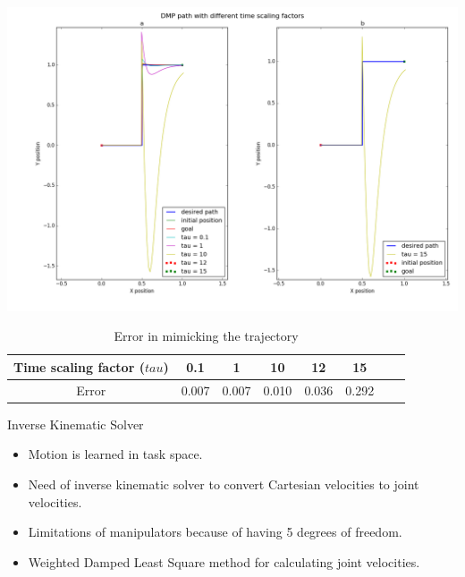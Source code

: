 \documentclass{beamer}
\begin{document}
	
	\begin{frame}
		\includegraphics[width=\textwidth]{images/tau_}
	\end{frame}
	
	\begin{frame}
		\begin{center}
			\begin{table}[H]
				\centering
				\begin{tabular}{| c | c | c | c | c | c | c | c |}	
					\hline
					Time scaling factor ($tau$) & 0.1 & 1 & 10 & 12 & 15 \\       
					\hline
					Error & 0.007 & 0.007 & 0.010 & 0.036 & 0.292   \\
					\hline
				\end{tabular}
				\caption{Error in mimicking the trajectory}
			\end{table}\label{_tau_e}
		\end{center}
	\end{frame}
	
	\begin{frame}{Inverse Kinematic Solver}
		\begin{itemize}
			\item Motion is learned in task space. 
			\item Need of inverse kinematic solver to convert Cartesian velocities to joint velocities. 
			\item Limitations of manipulators because of having 5 degrees of freedom.
			\item Weighted Damped Least Square method for calculating joint velocities.
		\end{itemize}	
	\end{frame}
	
\end{document}
